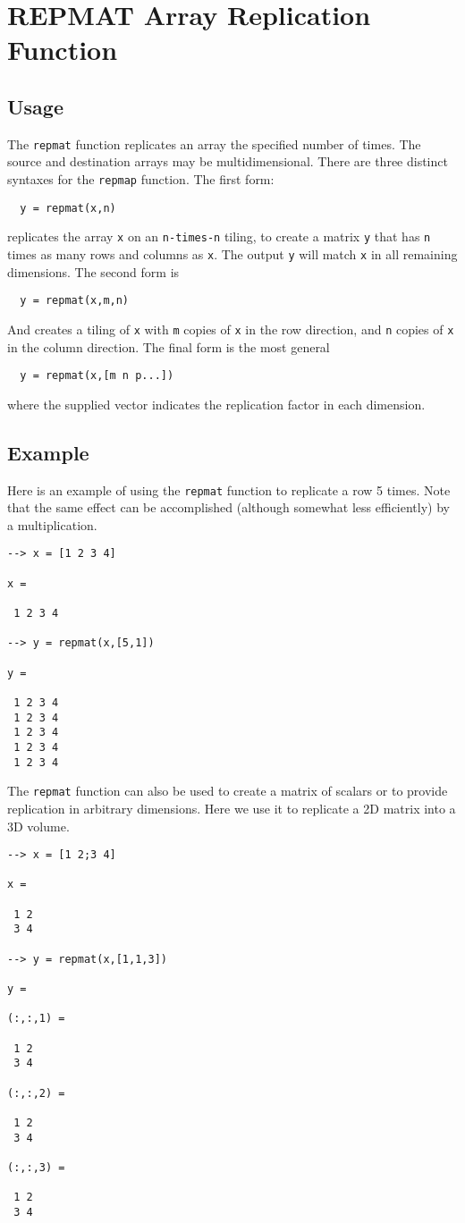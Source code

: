 \section{REPMAT Array Replication Function}

\subsection{Usage}

The \verb|repmat| function replicates an array the specified
number of times.  The source and destination arrays may
be multidimensional.  There are three distinct syntaxes for
the \verb|repmap| function.  The first form:
\begin{verbatim}
  y = repmat(x,n)
\end{verbatim}
replicates the array \verb|x| on an \verb|n-times-n| tiling, to create
a matrix \verb|y| that has \verb|n| times as many rows and columns
as \verb|x|.  The output \verb|y| will match \verb|x| in all remaining
dimensions.  The second form is
\begin{verbatim}
  y = repmat(x,m,n)
\end{verbatim}
And creates a tiling of \verb|x| with \verb|m| copies of \verb|x| in the
row direction, and \verb|n| copies of \verb|x| in the column direction.
The final form is the most general
\begin{verbatim}
  y = repmat(x,[m n p...])
\end{verbatim}
where the supplied vector indicates the replication factor in 
each dimension.  
\subsection{Example}

Here is an example of using the \verb|repmat| function to replicate
a row 5 times.  Note that the same effect can be accomplished
(although somewhat less efficiently) by a multiplication.
\begin{verbatim}
--> x = [1 2 3 4]

x = 

 1 2 3 4 

--> y = repmat(x,[5,1])

y = 

 1 2 3 4 
 1 2 3 4 
 1 2 3 4 
 1 2 3 4 
 1 2 3 4 
\end{verbatim}
The \verb|repmat| function can also be used to create a matrix of scalars
or to provide replication in arbitrary dimensions.  Here we use it to
replicate a 2D matrix into a 3D volume.
\begin{verbatim}
--> x = [1 2;3 4]

x = 

 1 2 
 3 4 

--> y = repmat(x,[1,1,3])

y = 

(:,:,1) = 

 1 2 
 3 4 

(:,:,2) = 

 1 2 
 3 4 

(:,:,3) = 

 1 2 
 3 4 
\end{verbatim}
